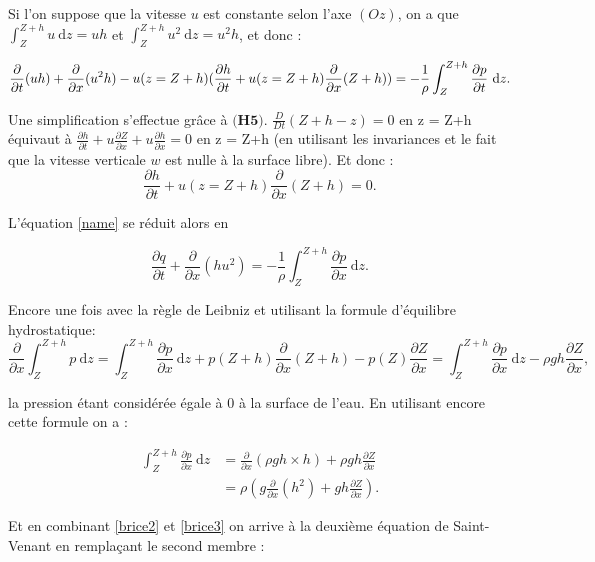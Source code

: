 \documentclass[
11pt, %
francais, %
singlespacing, %
headsepline, %
]{MastersDoctoralThesis} %
\theoremstyle{definition}
\begin{document}
Si l'on suppose que la vitesse $u$ est constante selon l'axe $(Oz)$, on a que $\int_{Z}^{Z+h}u ~\mathrm dz = uh$ et $\int_{Z}^{Z+h}u^{2} ~\mathrm dz = u^{2}h$, et donc :

\begin{equation}
 \frac{\partial}{\partial t}(uh)+ \frac{\partial}{\partial x}(u^{2}h)-u(z=Z+h)(\frac{\partial h}{\partial t}+u(z=Z+h)\frac{\partial}{\partial x}(Z+h)) \\
 =-\frac{1}{\rho}\int_{Z}^{Z+h}\frac{\partial p}{\partial t} ~\mathrm dz. \label{name}
\end{equation}

Une simplification s'effectue grâce à $\textbf{(H5)}$.  $\frac{D}{Dt} (Z+h-z) = 0$ en z = Z+h équivaut à $\frac{\partial h}{\partial t}+u\frac{\partial Z}{\partial x}+u\frac{\partial h}{\partial x}=0$ en z = Z+h (en utilisant les invariances et le fait que la vitesse verticale $w$ est nulle à la surface libre). Et donc : $$\frac{\partial h}{\partial t}+u(z=Z+h)\frac{\partial}{\partial x}(Z+h)=0.$$

L'équation \ref{name} se réduit alors en

\begin{equation}
 \frac{\partial q}{\partial t}+ \frac{\partial}{\partial x}(hu^{2})=-\frac{1}{\rho}\int_{Z}^{Z+h}\frac{\partial p}{\partial x} ~\mathrm dz. \label{brice2}
 \end{equation}

Encore une fois avec la règle de Leibniz et utilisant la formule d'équilibre hydrostatique:
$$ \frac{\partial }{\partial x}\int_{Z}^{Z+h}p ~\mathrm dz =\int_{Z}^{Z+h}\frac{\partial p}{\partial x}~\mathrm dz + p(Z+h)\frac{\partial}{\partial x}(Z+h)-p(Z)\frac{\partial Z}{\partial x} = \int_{Z}^{Z+h}\frac{\partial p}{\partial x} ~\mathrm dz-\rho g h\frac{\partial Z}{\partial x},$$ 

la pression étant considérée égale à $0$ à la surface de l'eau. En utilisant encore cette formule on a :

\begin{equation}
\begin{split}
\int_{Z}^{Z+h}\frac{\partial p}{\partial x} ~\mathrm dz&=\frac{\partial}{\partial x} (\rho gh\times h) + \rho gh\frac{\partial Z}{\partial x}\\ \label{brice3}
&=\rho(g\frac{\partial}{\partial x}(h^{2})+gh\frac{\partial Z}{\partial x}).
\end{split}
\end{equation}

Et en combinant \ref{brice2} et \ref{brice3} on arrive à la deuxième équation de Saint-Venant en rempla\c cant le second membre :
\end{document}
